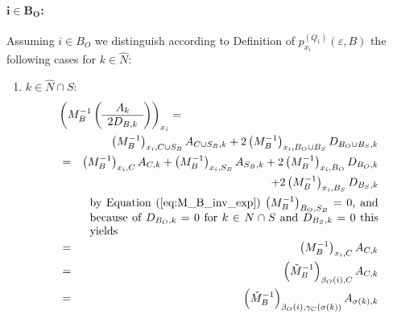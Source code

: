 \documentclass[a4paper]{article}
\begin{document}
\paragraph{$\mathbf{i \in B_{O}}$:}
Assuming $i \in B_{O}$ we distinguish
according to Definition of $p_{x_{i}}^{(Q_{1})}(\varepsilon, B)$
the following cases for $k \in \hat{N}$:
\begin{enumerate}
\item $k \in \hat{N} \cap S$:
\begin{eqnarray}
\label{eq:r1_i_B_O_k_N_S}
\lefteqn{\left(M_{B}^{-1}
           \left(\begin{array}{c}
                   A_{k} \\
	           \hline
	           2D_{B, k}
	         \end{array}
           \right)
         \right)_{x_{i}}
=} \nonumber \\
&&
\left(M_{B}^{-1}\right)_{x_{i}, C \cup S_{B}}A_{C \cup S_{B}, k}
+2\left(M_{B}^{-1}\right)_{x_{i}, B_{O} \cup B_{S}}D_{B_{O} \cup B_{S}, k}
\nonumber \\
&=&
\left(M_{B}^{-1}\right)_{x_{i}, C}A_{C, k}
+\left(M_{B}^{-1}\right)_{x_{i}, S_{B}}A_{S_{B}, k}
+2\left(M_{B}^{-1}\right)_{x_{i}, B_{O}}D_{B_{O}, k}
\nonumber \\
&&
+2\left(M_{B}^{-1}\right)_{x_{i}, B_{S}}D_{B_{S}, k}
\nonumber \\
&&\begin{minipage}{9cm}
by Equation~(\ref{eq:M_B_inv_exp}) $\left(M_{B}^{-1}\right)_{B_{O}, S_{B}}=0$,
and because of $D_{B_{O}, k}=0$ for $k \in N \cap S$
and $D_{B_{S},k}=0$ this yields 
\end{minipage}
\nonumber \\
&=&
\left(M_{B}^{-1}\right)_{x_{i}, C}A_{C, k}
\nonumber \\
&=&
\left(\check{M}_{B}^{-1}\right)_{\beta_{O}(i),C}A_{C, k}
\nonumber \\
&=&
\left(\check{M}_{B}^{-1}\right)_{\beta_{O}(i), \gamma_{C}(\sigma(k))}
  A_{\sigma(k), k}
\end{eqnarray}


\end{enumerate}
\end{document}
